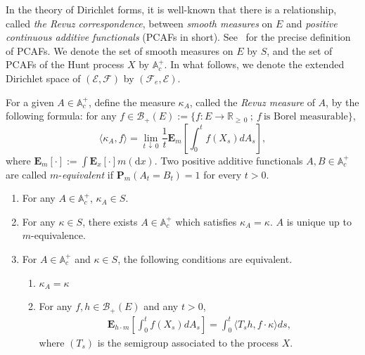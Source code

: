 \documentclass[AHL,Unicode,longabstracts,published]{cedram}
\newcommand{\ce}{\mathcal{E}}
\newcommand{\cf}{\mathcal{F}}
\newcommand{\cb}{\mathcal{B}}
\newcommand{\ba}{\mathbb{A}}
\newcommand{\br}{\mathbb{R}}
\newcommand{\bfE}{\mathbf{E}}
\newcommand{\bfP}{\mathbf{P}}
\newcommand{\rmd}{\mathrm{d}}
\newcommand*{\alphenumi}{\renewcommand*{\theenumi}{\alph{enumi}}}
\begin{document}
In the theory of Dirichlet forms, it is well-known that there is a relationship, called \emph{the Revuz correspondence}, between \emph{smooth measures} on $E$ and \emph{positive continuous additive functionals} (PCAFs in short). See~\cite{CF,FOT} for the precise definition of PCAFs. We denote the set of smooth measures on $E$ by $S$, and the set of PCAFs of the Hunt process $X$ by $\ba_c^{+}$. In what follows, we denote the extended Dirichlet space of $(\ce,\cf)$ by $(\cf_e,\ce)$.

For a given $A\in\ba_c^{+}$, define the measure $\kappa_A$, called the \emph{Revuz measure} of $A$, by the following formula: for any $f\in\cb_+(E):=\{f:E\to\br_{\geq\,0}\ ;\ f\ \text{is\ Borel\ measurable}\}$,
\[
\langle\kappa_A,f\rangle=\lim_{t\,\downarrow\,0}\frac{1}{t}\bfE_m\left[\int_0^tf(X_s)dA_s\right],
\]
where $\bfE_m[\cdot]:=\int \bfE_x[\cdot]m(\rmd x)$. Two positive additive functionals $A,B\in\ba_c^+$ are called $m$-\emph{equivalent} if $\bfP_m(A_t=B_t)=1$ for every $t>0$.

\begin{theo}\label{7.1}\leavevmode
\begin{enumerate}
\item For any $A\in\ba_c^+$, $\kappa_A\in S$.
\item For any $\kappa\in S$, there exists $A\in\ba_c^+$ which satisfies $\kappa_A=\kappa$. $A$ is unique up to $m$-equivalence.
\item For $A\in\ba_c^+$ and $\kappa\in S$, the following conditions are equivalent.
\begin{enumerate}\alphenumi
\item $\kappa_A=\kappa$
\item For any $f,h\in\cb_+(E)$ and any $t>0$,
\begin{align}\label{revuz-corr}
\bfE_{h\cdot m}\left[\int_0^{t}f(X_s)dA_s\right]=\int_0^t\langle T_{s}h,f\cdot\kappa\rangle ds,
\end{align}
where $(T_s)$ is the semigroup associated to the process $X$.
\end{enumerate}
\end{enumerate}
\end{theo}
\end{document}
